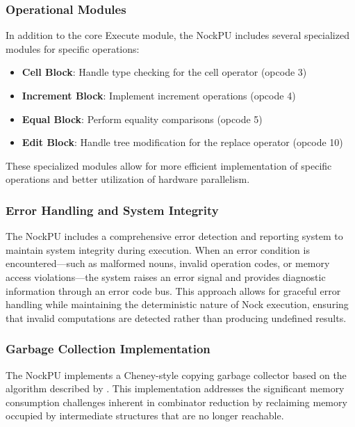 \documentclass[twoside]{article}
\begin{document}
\subsubsection{Operational Modules}

In addition to the core Execute module, the NockPU includes several specialized modules for specific operations:

\begin{itemize}
  \item \textbf{Cell Block}: Handle type checking for the cell operator (opcode 3)
  \item \textbf{Increment Block}: Implement increment operations (opcode 4)
  \item \textbf{Equal Block}: Perform equality comparisons (opcode 5)
  \item \textbf{Edit Block}: Handle tree modification for the replace operator (opcode 10)
\end{itemize}

\noindent
These specialized modules allow for more efficient implementation of specific operations and better utilization of hardware parallelism.

\subsubsection{Error Handling and System Integrity}

The NockPU includes a comprehensive error detection and reporting system to maintain system integrity during execution. When an error condition is encountered—such as malformed nouns, invalid operation codes, or memory access violations—the system raises an error signal and provides diagnostic information through an error code bus. This approach allows for graceful error handling while maintaining the deterministic nature of Nock execution, ensuring that invalid computations are detected rather than producing undefined results.

\subsubsection{Garbage Collection Implementation}

The NockPU implements a Cheney-style copying garbage collector based on the algorithm described by \citet{Clark1976}. This implementation addresses the significant memory consumption challenges inherent in combinator reduction by reclaiming memory occupied by intermediate structures that are no longer reachable.
\end{document}
